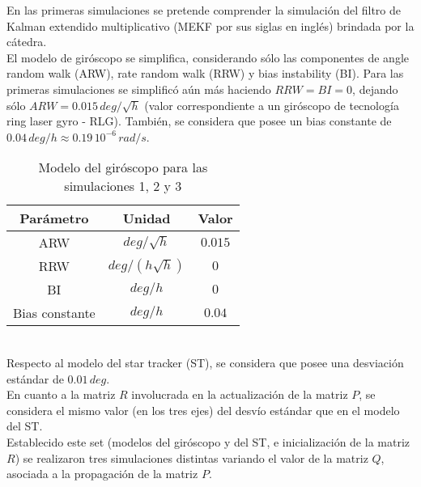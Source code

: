 \documentclass[a4paper,11pt,twoside]{IT-CNEA}
\begin{document}
    \tableofcontents       
    \printnomenclature[2cm]

\clearpage  
\newpage
En las primeras simulaciones se pretende comprender la simulación del filtro de Kalman extendido multiplicativo (MEKF por sus siglas en inglés) brindada por la cátedra. 
\\ El modelo de giróscopo se simplifica, considerando sólo las componentes de angle random walk (ARW), rate random walk (RRW) y bias instability (BI). Para las primeras simulaciones se simplificó aún más haciendo $RRW=BI=0$, dejando sólo $ARW=0.015\,deg/\sqrt{h}$ (valor correspondiente a un giróscopo de tecnología ring laser gyro - RLG). También, se considera que posee un bias constante de $0.04\,deg/h\approx 0.19\,10^{-6}\,rad/s$. 
\begin{table}[h!]
\centering
\caption{Modelo del giróscopo para las simulaciones 1, 2 y 3}
\label{tabla:modeloGyroRLGSimulaciones123}
\begin{tabular}{|c|c|c|}
\hline
Parámetro & Unidad& Valor\\ \hline
ARW&$deg/\sqrt{h}$&$0.015$ \\ \hline
RRW&$deg/\left(h\sqrt{h}\right)$&$0$ \\ \hline
BI&$deg/h$&$0$ \\ \hline
Bias constante&$deg/h$&$0.04$ \\ \hline
\end{tabular}
\end{table}
\\ Respecto al modelo del star tracker (ST), se considera que posee una desviación estándar de $0.01\,deg$.
\\ En cuanto a la matriz $R$ involucrada en la actualización de la matriz $P$, se considera el mismo valor (en los tres ejes) del desvío estándar que en el modelo del ST. 
\\ Establecido este set (modelos del giróscopo y del ST, e inicialización de la matriz $R$) se realizaron tres simulaciones distintas variando el valor de la matriz $Q$, asociada a la propagación de la matriz $P$. 
\end{document}
